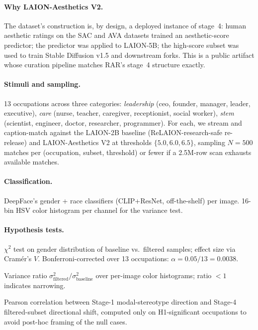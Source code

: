 \documentclass[manuscript, nonacm, screen, review]{acmart}
\begin{document}
\paragraph{Why LAION-Aesthetics V2.} The dataset's construction is, by design, a deployed instance of stage~4: human aesthetic ratings on the SAC and AVA datasets trained an aesthetic-score predictor; the predictor was applied to LAION-5B; the high-score subset was used to train Stable Diffusion v1.5 and downstream forks. This is a public artifact whose curation pipeline matches RAR's stage~4 structure exactly.

\paragraph{Stimuli and sampling.} 13 occupations across three categories: \emph{leadership} (ceo, founder, manager, leader, executive), \emph{care} (nurse, teacher, caregiver, receptionist, social worker), \emph{stem} (scientist, engineer, doctor, researcher, programmer). For each, we stream and caption-match against the LAION-2B baseline (ReLAION-research-safe re-release) and LAION-Aesthetics V2 at thresholds $\{5.0, 6.0, 6.5\}$, sampling $N\!=\!500$ matches per (occupation, subset, threshold) or fewer if a 2.5M-row scan exhausts available matches.

\paragraph{Classification.} DeepFace's gender + race classifiers (CLIP+ResNet, off-the-shelf) per image. 16-bin HSV color histogram per channel for the variance test.

\paragraph{Hypothesis tests.}
\begin{description}\itemsep0pt
\item[H1 (demographic redistribution).] $\chi^2$ test on gender distribution of baseline vs.\ filtered samples; effect size via Cramér's $V$. Bonferroni-corrected over 13 occupations: $\alpha\!=\!0.05/13\!=\!0.0038$.
\item[H2 (aesthetic narrowing).] Variance ratio $\sigma^2_{\text{filtered}}/\sigma^2_{\text{baseline}}$ over per-image color histograms; ratio $<1$ indicates narrowing.
\item[H3 (cross-amplification).] Pearson correlation between Stage-1 modal-stereotype direction and Stage-4 filtered-subset directional shift, computed only on H1-significant occupations to avoid post-hoc framing of the null cases.
\end{description}
\end{document}
